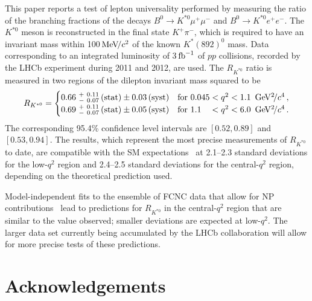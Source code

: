 \documentclass[12pt,a4paper]{article}
\def\RKst    {\mbox{R_{\Kstarz}}}
\def\lhcb {\mbox{LHCb}\xspace}
\def\Pmu         {\ensuremath{\upmu}\xspace}
\def\Ppi         {\ensuremath{\uppi}\xspace}
\def\PB      {\ensuremath{\mathrm{B}}\xspace}
\def\PK      {\ensuremath{\mathrm{K}}\xspace}
\def\Pe      {\ensuremath{\mathrm{e}}\xspace}
\def\Pp      {\ensuremath{\mathrm{p}}\xspace}
\def\Pmu         {\ensuremath{\mu}\xspace}
\def\Ppi         {\ensuremath{\pi}\xspace}
\def\PB      {\ensuremath{B}\xspace}
\def\PK      {\ensuremath{K}\xspace}
\def\Pe      {\ensuremath{e}\xspace}
\def\Pp      {\ensuremath{p}\xspace}
\def\epem       {\ensuremath{\Pe^+\Pe^-}\xspace}
\def\mup        {\ensuremath{\Pmu^+}\xspace}
\def\mun        {\ensuremath{\Pmu^-}\xspace} \def\mumu       {\ensuremath{\Pmu^+\Pmu^-}\xspace}
\def\pion  {\ensuremath{\Ppi}\xspace}
\def\pim   {\ensuremath{\pion^-}\xspace}
\def\kaon  {\ensuremath{\PK}\xspace}
\def\Kp    {\ensuremath{\kaon^+}\xspace}
\def\Kstarz  {\ensuremath{\kaon^{*0}}\xspace}
\def\Kstar   {\ensuremath{\kaon^*}\xspace}
\def\B       {\ensuremath{\PB}\xspace}
\def\Bd      {\ensuremath{\B^0}\xspace}
\def\proton      {\ensuremath{\Pp}\xspace}
\newcommand{\decay}[2]{\ensuremath{#1\!\to #2}\xspace}         \def\ra                 {\ensuremath{\rightarrow}\xspace}
\def\to                 {\ensuremath{\rightarrow}\xspace}
\def\qsq       {\ensuremath{q^2}\xspace}
\def\BdToKstmm    {\decay{\Bd}{\Kstarz\mup\mun}}
\newcommand{\gevgevcccc}{\ensuremath{{\mathrm{\,Ge\kern -0.1em V^2\!/}c^4}}\xspace}
\newcommand{\mevcc}{\ensuremath{{\mathrm{\,Me\kern -0.1em V\!/}c^2}}\xspace}
\def\invfb   {\ensuremath{\mbox{\,fb}^{-1}}\xspace}
\newcommand{\stat}{\ensuremath{\mathrm{\,(stat)}}\xspace}
\newcommand{\syst}{\ensuremath{\mathrm{\,(syst)}}\xspace}
\def\lqsq{low-\qsq}
\def\cqsq{central-\qsq}
\def\RKst{\ensuremath{R_{\Kstarz}}\xspace}
\def\pp{\ensuremath{\proton\proton}\xspace}
\def\KPi{\ensuremath{\Kp\pim}\xspace}
\def\BdToKstmm{\mbox{\decay{\Bd}{\Kstarz \mumu}}\xspace}
\def\BdToKstee{\mbox{\decay{\Bd}{\Kstarz \epem}}\xspace}
\begin{document}
This paper reports a test of lepton universality performed by measuring the ratio of the branching fractions of the decays \BdToKstmm and \BdToKstee.
The \Kstarz meson is reconstructed in the final state \KPi, which is required to have an invariant mass within 100\mevcc of the known $\Kstar(892)^{0}$ mass. 
Data corresponding to an integrated luminosity of 3\invfb of \pp collisions, recorded by the \lhcb experiment during 2011 and 2012, are used.
The \RKst ratio is measured in two regions of the dilepton invariant mass squared to be
\begin{eqnarray*}
\RKst = 
\begin{cases}
0.66~^{+~0.11}_{-~0.07}\stat  \pm 0.03\syst	& \textrm{for } 0.045 < \qsq < 1.1~\gevgevcccc \, , \\
0.69~^{+~0.11}_{-~0.07}\stat \pm 0.05\syst	& \textrm{for } 1.1\phantom{00} < \qsq < 6.0~\gevgevcccc \, .
\end{cases}
\end{eqnarray*}
The corresponding 95.4\% confidence level intervals are $[0.52, 0.89]$ and $[0.53, 0.94]$. 
The results, which represent the most precise measurements of \RKst to date, are compatible with the SM expectations~\cite{Bordone:2016gaq,Descotes-Genon:2015uva,Capdevila:2016ivx,Capdevila:2017ert,Serra:2016ivr,EOS-Web,*EOS,Straub:2015ica,Altmannshofer:2017fio,flavio,Jager:2014rwa} at 2.1--2.3 standard deviations for the \lqsq region and 2.4--2.5 standard deviations for the central-\qsq region, depending on the theoretical prediction used.

Model-independent fits to the ensemble of FCNC data that allow for NP contributions~\cite{Descotes-Genon:2015uva,Capdevila:2016ivx,Capdevila:2017ert,Serra:2016ivr,EOS-Web,*EOS,Straub:2015ica,Altmannshofer:2017fio,flavio,Jager:2014rwa} lead to predictions for \RKst in the \cqsq region that are similar to the value observed; smaller deviations are expected at \lqsq.
The larger data set currently being accumulated by the \lhcb collaboration will allow for more precise tests of these predictions.
 
\section*{Acknowledgements}
\end{document}
